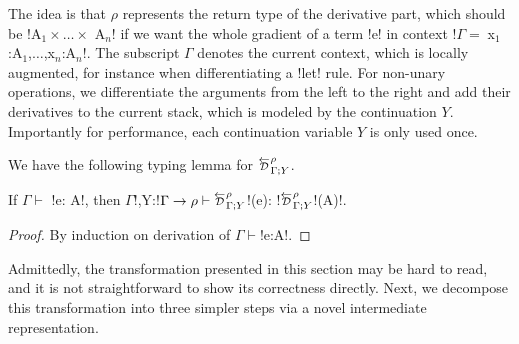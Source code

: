 The idea is that $\rho$ represents the return type of the derivative part, which should be !A$_{1} \times \ldots \times$ A$_n$! 
if we want the whole gradient of a term !e! in context !$\Gamma = \;$x$_{1}$:A$_{1}$,$\ldots$,x$_n$:A$_n$!.
The subscript $\Gamma$ denotes the current context, 
which is locally augmented, for instance when differentiating a !let! rule.
For non-unary operations, we differentiate the arguments from the left to the right and add their derivatives to the current stack, 
which is modeled by the continuation $Y$. 
Importantly for performance, each continuation variable $Y$ is only used once.

We have the following typing lemma for $\directD{\rho}{\Gamma}{Y}$.
\begin{lemma}
    If $\Gamma \vdash$ !e: A!, then $\Gamma$!,Y:!$\Gamma\to \rho \vdash \directD{\rho}{\Gamma}{Y}$!(e): !$\directD{\rho}{\Gamma}{Y}$!(A)!.
\end{lemma}
\begin{proof}
By induction on derivation of $\Gamma\vdash$!e:A!.
\end{proof}



Admittedly, the transformation presented in this section may be hard to read, and it is not straightforward to show its correctness directly. 
Next, we decompose this transformation into three simpler steps via a novel intermediate representation.
